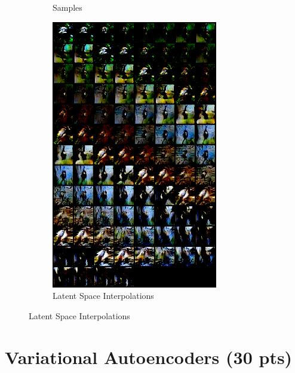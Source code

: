 \documentclass[11pt,addpoints,answers]{exam}
\numberwithin{equation}{section} %
\numberwithin{figure}{section} %
\numberwithin{table}{section} %
\begin{document}
\begin{questions}
\begin{figure}[H]
\begin{subfigure}[b]{0.32\linewidth}
        \caption{Samples}
    \end{subfigure}
    \begin{subfigure}[b]{0.32\linewidth}
        \includegraphics[width=\linewidth]{1.5_interpolations.png}
        \caption{Latent Space Interpolations}
    \end{subfigure}
\end{figure}    
\end{questions}
\clearpage

\section{Variational Autoencoders (30 pts)}
\end{document}
